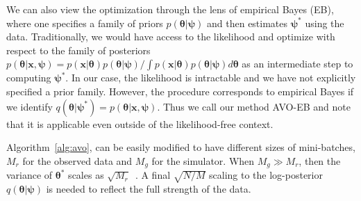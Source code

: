 \documentclass[twocolumn,superscriptaddress,aps]{revtex4-1}
\newcommand{\kcnote}[1]{\textcolor{red}{[KC: #1]}}
\newcommand{\qxpsi}{q(\mathbf{x}|\bfpsi)}
\newcommand{\bftheta}{{\bm \theta}}
\newcommand{\bfpsi}{{\bm \psi}}
\newcommand{\bfx}{\mathbf{x}}
\theoremstyle{plain}
\begin{document}
We can also view the optimization  through the lens of empirical Bayes (EB),
where one specifies a family of priors $p(\bftheta | \bfpsi)$ and then estimates $\bfpsi^*$ using the data.
Traditionally, we would have access to the likelihood and optimize with respect to the family of posteriors
 $p(\bftheta | \bfx, \bfpsi) = p(\bfx | \bftheta) p(\bftheta | \bfpsi) / \int p(\bfx | \bftheta) p(\bftheta | \bfpsi) d\bftheta $
as an intermediate step to computing $\bfpsi^*$. In our case, the likelihood is intractable and we have not explicitly
specified a prior family. However, the procedure corresponds to empirical Bayes if we identify
$q(\bftheta | \bfpsi^*) = p(\bftheta | \bfx , \bfpsi)$. Thus we call our method AVO-EB and note that it is applicable even outside of the likelihood-free context.

Algorithm~\ref{alg:avo}, can be easily modified to have different sizes of mini-batches,
$M_r$ for the observed data and $M_g$ for the simulator. When $M_g \gg M_r$,
then the variance of $\bftheta^*$ scales as
$\sqrt{M_r}$~\citep{bernton2017inference}. A final $\sqrt{N/M}$ scaling to the
log-posterior $q(\bftheta | \bfpsi)$ is needed to reflect the full strength of
the data.




\end{document}
